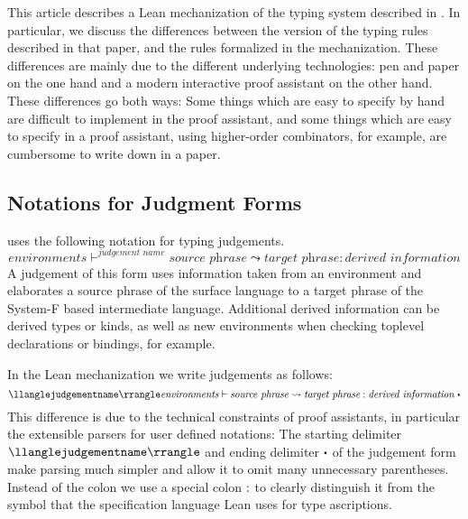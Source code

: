 This article describes a Lean mechanization of the typing system described in \cite{Faxen2002staticsemantics}.
In particular, we discuss the differences between the version of the typing rules described in that paper, and the rules formalized in the mechanization.
These differences are mainly due to the different underlying technologies: pen and paper on the one hand and a modern interactive proof assistant on the other hand.
These differences go both ways:
Some things which are easy to specify by hand are difficult to implement in the proof assistant, and some things which are easy to specify in a proof assistant, using higher-order combinators, for example, are cumbersome to write down in a paper.

\subsection{Notations for Judgment Forms}

\citet{Faxen2002staticsemantics} uses the following notation for typing judgements.
\begin{equation*}
    \textit{environments} \vdash^{\textit{judgement name}} \textit{source phrase} \leadsto \textit{target phrase} : \textit{derived information}
\end{equation*}
A judgement of this form uses information taken from an environment and elaborates a source phrase of the surface language to a target phrase of the System-F based intermediate language.
Additional derived information can be derived types or kinds, as well as new environments when checking toplevel declarations or bindings, for example.

In the Lean mechanization we write judgements as follows:
\begin{equation*}
    \jdgmtname{judgement name} \textit{environments} \vdash \textit{source phrase} \leadsto \textit{target phrase} \specialcolon \textit{derived information}\ \sqcdot
\end{equation*}
This difference is due to the technical constraints of proof assistants, in particular the extensible parsers for user defined notations:
The starting delimiter $\jdgmtname{judgement name}$ and ending delimiter $\sqcdot$ of the judgement form make parsing much simpler and allow it to omit many unnecessary parentheses.
Instead of the colon we use a special colon $:$ to clearly distinguish it from the symbol that the specification language Lean uses for type ascriptions.